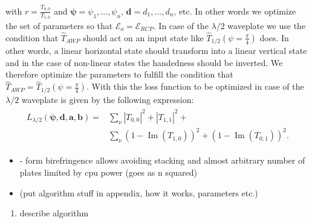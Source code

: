 with $r=\frac{T_{0,0}}{T_{1,0}}$ and $\bm{\psi}=\psi_1, ..., \psi_n$, $\bm{d}=d_1, ..., d_n$, etc. In other words we optimize the set of parameters so that $\bm{\mathcal{E}}_o=\bm{\mathcal{E}}_{RCP}$.
In case of the $\lambda/2$ waveplate we use the condition that $\hat{T}_{AWP}$ should act on an input state like $\hat{T}_{1/2}(\psi=\frac{\pi}{4})$ does. In other words, a linear horizontal state should transform into a linear vertical state and in the case of non-linear states the handedness should be inverted. We therefore optimize the parameters to fulfill the condition that $\hat{T}_{AWP}=\hat{T}_{1/2}(\psi=\frac{\pi}{4})$. With this the loss function to be optimized in case of the $\lambda/2$ waveplate is given by the following expression:
\begin{align}
\begin{split}
    L_{\lambda/2}(\bm{\psi}, \bm{d}, \bm{a}, \bm{b})=
    &\sum_{\nu}|T_{0,0}|^2+|T_{1,1}|^2+\\
    &\sum_{\nu}(1 - \operatorname{Im}(T_{1,0}))^2+
    (1 - \operatorname{Im}(T_{0,1}))^2.
\end{split}
\end{align}



\begin{itemize}
    \item - form birefringence allows avoiding stacking and almost arbitrary number of plates
    limited by cpu power (goes as n squared)
    \item (put algorithm stuff in appendix, how it works, parameters etc.)
\end{itemize}
\begin{enumerate}
    \item describe algorithm
\end{enumerate}








